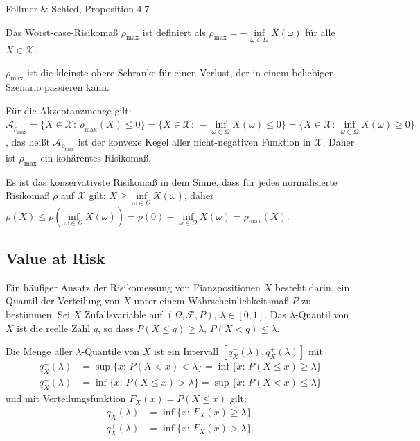 \documentclass[a4paper,twoside,DIV15,BCOR12mm]{scrbook}
\begin{document}
\begin{beweis}
Follmer \& Schied, Proposition 4.7
\end{beweis}

\begin{beispiel}
Das Worst-case-Risikomaß $\rho_{\max}$ ist definiert als $\rho_{\max}=-\inf\limits_{\omega\in\Omega} X(\omega)$ für alle $X\in\mathcal{X}$.

$\rho_{\max}$ ist die kleinste obere Schranke für einen Verlust, der in einem beliebigen Szenario passieren kann.

Für die Akzeptanzmenge gilt: $\mathcal{A}_{\rho_{\max}}=\{X\in\mathcal{X}:\, \rho_{\max}(X)\leq 0\}=\{X\in\mathcal{X}:\, -\inf\limits_{\omega\in\Omega} X(\omega) \leq 0\}=\{X\in\mathcal{X}:\, \inf\limits_{\omega\in\Omega} X(\omega) \geq 0\}$, das heißt $\mathcal{A}_{\rho_{\max}}$ ist der konvexe Kegel aller nicht-negativen Funktion in $\mathcal{X}$. Daher ist $\rho_{\max}$ ein kohärentes Risikomaß.

Es ist das konservativste Risikomaß in dem Sinne, dass für jedes normalisierte Risikomaß $\rho$ auf $\mathcal{X}$ gilt: $X\geq\inf\limits_{\omega\in\Omega} X(\omega)$, daher $\rho(X)\leq \rho(\inf\limits_{\omega\in\Omega} X(\omega))=\rho(0)-\inf\limits_{\omega\in\Omega} X(\omega)=\rho_{\max}(X)$.
\end{beispiel}

\subsection{Value at Risk}

Ein häufiger Ansatz der Risikomessung von Fianzpositionen $X$ besteht darin, ein Quantil der Verteilung von $X$ unter einem Wahrscheinlichkeitsmaß $ P$ zu bestimmen. Sei $X$ Zufallsvariable auf $(\Omega,\mathcal{F}, P)$, $\lambda\in[0, 1]$. Das $\lambda$-Quantil von $X$ ist die reelle Zahl $q$, so dass $ P(X\leq q) \geq \lambda,\,  P(X< q) \leq \lambda$.

Die Menge aller $\lambda$-Quantile von $X$ ist ein Intervall $[q_X^-(\lambda),q_X^+(\lambda)]$ mit 
\begin{align*}
q_X^-(\lambda)&=\sup\{x:\,  P(X<x)<\lambda\}=\inf\{x:\,  P(X\leq x)\geq \lambda\} \\
q_X^+(\lambda)&=\inf\{x:\,  P(X\leq x)>\lambda\}=\sup\{x:\,  P(X < x)\leq \lambda\}
\end{align*}
und mit Verteilungsfunktion $F_X(x)= P(X\leq x)$ gilt:
\begin{align*}
q_X^-(\lambda)&=\inf\{x:\, F_X(x)\geq \lambda\}\\
q_X^+(\lambda)&=\inf\{x:\, F_X(x)> \lambda\}.
\end{align*}
\end{document}
